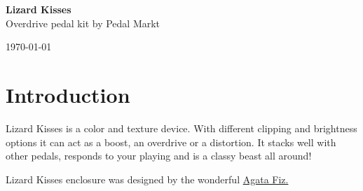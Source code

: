 \documentclass[a4paper,12pt]{article}
\begin{document}
\begin{titlepage}
  \begin{center}
    \Large\textbf{Lizard Kisses}\\
    \large{Overdrive pedal kit by Pedal Markt}
  \end{center}
  \vspace*{\fill}
  \begin{center}
    \today
  \end{center}
\end{titlepage}

\tableofcontents
\pagebreak

\section{Introduction}
Lizard Kisses is a color and texture device. With different
clipping and brightness options it can act as a boost, an
overdrive or a distortion. It stacks well with other pedals,
responds to your playing and is a classy beast all around!

Lizard Kisses enclosure was designed by the wonderful
\href{https://fiz.gallery/}{Agata Fiz.}
\end{document}
